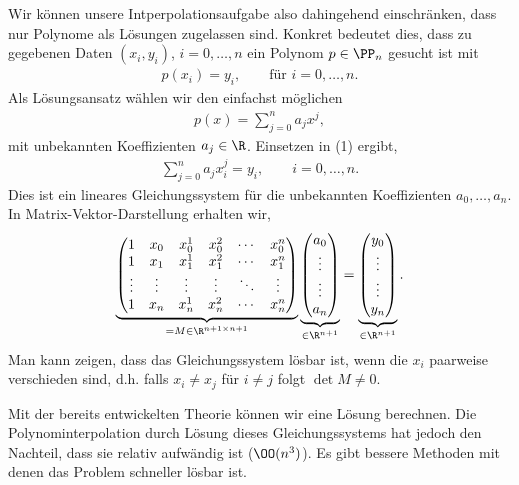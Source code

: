 Wir können unsere Intperpolationsaufgabe also dahingehend einschränken, dass
nur Polynome als Lösungen zugelassen sind. Konkret bedeutet dies, dass
zu gegebenen Daten $(x_i,y_i)$, $i=0,\ldots,n$ ein Polynom $p\in\PP_n$ gesucht
ist mit
\begin{align*}
p(x_i) = y_i,\qquad\text{für } i=0,\ldots,n.\tag{1}
\end{align*}
Als Lösungsansatz wählen wir den einfachst möglichen
\begin{align*}
p(x) = \sum\limits_{j=0}^n a_j x^j,
\end{align*}
mit unbekannten Koeffizienten $a_j\in\R$. Einsetzen in (1) ergibt,
\begin{align*}
\sum\limits_{j=0}^n a_j x_i^j = y_i,\qquad i=0,\ldots,n.
\end{align*}
Dies ist ein lineares Gleichungssystem für die unbekannten Koeffizienten
$a_0,\ldots,a_n$. In Matrix-Vektor-Darstellung erhalten wir,
\begin{align*}
\underbrace{
\begin{pmatrix}
1 & x_0 & x_0^1 & x_0^2 & \cdots & x_0^n\\
1 & x_1 & x_1^1 & x_1^2 & \cdots & x_1^n\\
\vdots & \vdots & \vdots & \vdots & \ddots & \vdots\\
1 & x_n & x_n^1 & x_n^2 & \cdots & x_n^n\\
\end{pmatrix}
}_{=M\in\R^{n+1\times n+1}}
\underbrace{
\begin{pmatrix}
a_0 \\ \vdots \\ \vdots\\ a_n
\end{pmatrix}
}_{\in\R^{n+1}}
=
\underbrace{
\begin{pmatrix}
y_0\\ \vdots \\ \vdots \\ y_n
\end{pmatrix}}_{\in\R^{n+1}}.
\end{align*}
Man kann zeigen, dass das Gleichungssystem lösbar ist, wenn die $x_i$ paarweise
verschieden sind, d.h. falls $x_i\neq x_j$ für $i\neq j$ folgt $\det M\neq 0$.

Mit der bereits entwickelten Theorie können wir eine Lösung berechnen. Die
Polynominterpolation durch Lösung dieses Gleichungssystems hat jedoch den
Nachteil, dass sie relativ aufwändig ist ($\OO(n^3)$). Es gibt bessere
Methoden mit denen das Problem schneller lösbar ist.

